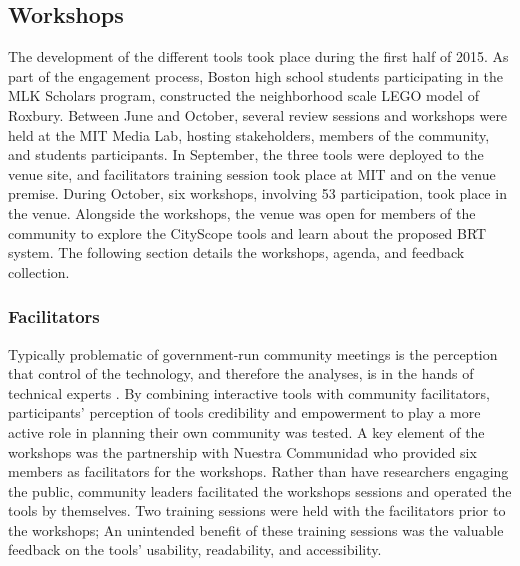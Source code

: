 {    \subsection{Workshops}
    {
        The development of the different tools took place during the first half of 2015. As part of the engagement process, Boston high school students participating in the MLK Scholars program, constructed the neighborhood scale LEGO model of Roxbury. Between June and October, several review sessions and workshops were held at the MIT Media Lab, hosting stakeholders, members of the community, and students participants. In September, the three tools were deployed to the venue site, and facilitators training session took place at MIT and on the venue premise. During October, six workshops, involving 53 participation, took place in the venue. Alongside the workshops, the venue was open for members of the community to explore the CityScope tools and learn about the proposed BRT system. The following section details the workshops, agenda, and feedback collection.

        \subsubsection{Facilitators}
        {
            Typically problematic of government-run community meetings is the perception that control of the technology, and therefore the analyses, is in the hands of technical experts \cite{innes2010planning, arnstein1969ladder}. By combining interactive tools with community facilitators, participants' perception of tools credibility and empowerment to play a more active role in planning their own community was tested.
            \newline
            A key element of the workshops was the partnership with Nuestra Communidad \cite{nuestracdc:online} who provided six members as facilitators for the workshops. Rather than have researchers engaging the public, community leaders facilitated the workshops sessions and operated the tools by themselves. Two training sessions were held with the facilitators prior to the workshops; An unintended benefit of these training sessions was the valuable feedback on the tools' usability, readability, and accessibility.
        }

}}
